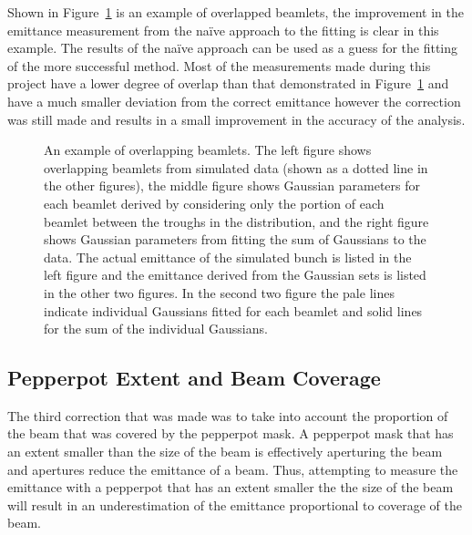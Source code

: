 Shown in Figure~\ref{figure:overlap_example} is an example of overlapped beamlets, the improvement in the emittance measurement from the na\"ive approach to the fitting is clear in this example.
The results of the na\"ive approach can be used as a guess for the fitting of the more successful method.
Most of the measurements made during this project have a lower degree of overlap than that demonstrated in Figure~\ref{figure:overlap_example} and have a much smaller deviation from the correct emittance however the correction was still made and results in a small improvement in the accuracy of the analysis.

\begin{figure}
    \center
    
    \caption{An example of overlapping beamlets.
    The left figure shows overlapping beamlets from simulated data (shown as a dotted line in the other figures), the middle figure shows Gaussian parameters for each beamlet derived by considering only the portion of each beamlet between the troughs in the distribution, and the right figure shows Gaussian parameters from fitting the sum of Gaussians to the data.
    The actual emittance of the simulated bunch is listed in the left figure and the emittance derived from the Gaussian sets is listed in the other two figures.
    In the second two figure the pale lines indicate individual Gaussians fitted for each beamlet and solid lines for the sum of the individual Gaussians.}
    \label{figure:overlap_example}
\end{figure}


\subsection{Pepperpot Extent and Beam Coverage}
The third correction that was made was to take into account the proportion of the beam that was covered by the pepperpot mask.
A pepperpot mask that has an extent smaller than the size of the beam is effectively aperturing the beam and apertures reduce the emittance of a beam.
Thus, attempting to measure the emittance with a pepperpot that has an extent smaller the the size of the beam will result in an underestimation of the emittance proportional to coverage of the beam.

